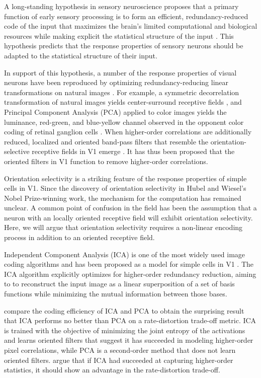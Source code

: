 A long-standing hypothesis in sensory neuroscience proposes that a primary function of early sensory processing is to form an efficient, redundancy-reduced code of the input that maximizes the brain's limited computational and biological resources while making explicit the statistical structure of the input \cite{barlow2001redundancy}. This hypothesis predicts that the response properties of sensory neurons should be adapted to the statistical structure of their input.

In support of this hypothesis, a number of the response properties of visual neurons have been reproduced by optimizing redundancy-reducing linear transformations on natural images \cite{atick1990towards}. For example, a symmetric decorrelation transformation of natural images yields center-surround receptive fields \cite{atick1990towards}, and Principal Component Analysis (PCA) applied to color images yields the luminance, red-green, and blue-yellow channel observed in the opponent color coding of retinal ganglion cells \cite{ruderman1998statistics, buchsbaum1983trichromacy}. When higher-order correlations are additionally reduced, localized and oriented band-pass filters that resemble the orientation-selective receptive fields in V1 emerge \cite{bell1997independent, olshausen1999probabilistic}. It has thus been proposed that the oriented filters in V1 function to remove higher-order correlations.

Orientation selectivity is a striking feature of the response properties of simple cells in V1. Since the discovery of orientation selectivity in Hubel and Wiesel's Nobel Prize-winning work, the mechanism for the computation has remained unclear. A common point of confusion in the field has been the assumption that a neuron with an locally oriented receptive field will exhibit orientation selectivity. Here, we will argue that orientation selectivity requires a non-linear encoding process in addition to an oriented receptive field.

Independent Component Analysis (ICA) is one of the most widely used image coding algorithms and has been proposed as a model for simple cells in V1 \cite{bell1997independent}. The ICA algorithm explicitly optimizes for higher-order redundancy reduction, aiming to to reconstruct the input image as a linear superposition of a set of basis functions while minimizing the mutual information between those bases.

 compare the  coding efficiency of ICA and PCA to obtain the surprising result that ICA performs no better than PCA on a rate-distortion trade-off metric. ICA is trained with the objective of minimizing the joint entropy of the activations and learns oriented filters that suggest it has succeeded in modeling higher-order pixel correlations, while PCA is a second-order method that does not learn oriented filters.  argue that if ICA had succeeded at capturing higher-order statistics, it should show an advantage in the rate-distortion trade-off.

